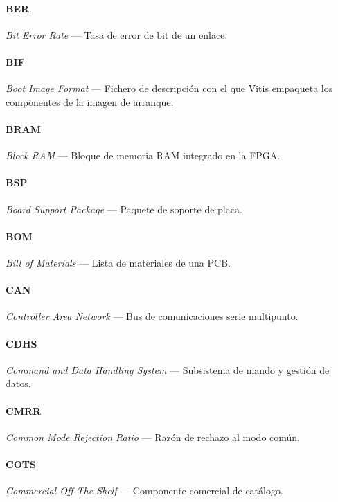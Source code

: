 \paragraph{BER} \textit{Bit Error Rate} --- Tasa de error de bit de un enlace.

\paragraph{BIF} \textit{Boot Image Format} --- Fichero de descripción con el que Vitis empaqueta los componentes de la imagen de arranque.

\paragraph{BRAM} \textit{Block RAM} --- Bloque de memoria RAM integrado en la FPGA.

\paragraph{BSP} \textit{Board Support Package} --- Paquete de soporte de placa.

\paragraph{BOM} \textit{Bill of Materials} --- Lista de materiales de una PCB.

\paragraph{CAN} \textit{Controller Area Network} --- Bus de comunicaciones serie multipunto.

\paragraph{CDHS} \textit{Command and Data Handling System} --- Subsistema de mando y gestión de datos.

\paragraph{CMRR} \textit{Common Mode Rejection Ratio} --- Razón de rechazo al modo común.

\paragraph{COTS} \textit{Commercial Off-The-Shelf} --- Componente comercial de catálogo.

